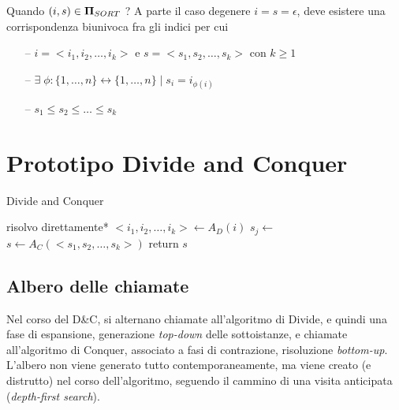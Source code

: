 Quando $ (i,s) \in \bm{\Pi}{}_{SORT} $ ? A parte il caso degenere $i=s=\epsilon$, deve esistere una corrispondenza biunivoca fra gli indici per cui
\begin{itemize}[noitemsep,parsep=0pt,partopsep=0pt]
    \item[--] $i = <i_1, i_2, \dots, i_k> $ e $ s = <s_1, s_2, \dots, s_k> $ con $k \geq 1$
    \item[--] $ \exists \;\phi:\{1, \dots, n\} \leftrightarrow \{1, \dots, n\} \;|\; s_i = i_{\phi(i)}$
    \item[--] $ s_1 \leq s_2 \leq \dots \leq s_k$ 
\end{itemize}

\section{Prototipo Divide and Conquer}

\begin{algorithm}[H]
\caption{Divide and Conquer}\label{alg:dnc}
\begin{algorithmic}[1]
                                     
            \State *risolvo direttamente*
        \EndIf
        \State $<i_1, i_2, \dots, i_k> \gets A_D(i)$    
                            
            \State $s_j \gets $ 
        \EndFor
        \State $s \gets A_C(<s_1, s_2, \dots, s_k>)$    
        \State return $s$
    \EndProcedure
\end{algorithmic}
\end{algorithm}

\subsection{Albero delle chiamate}
Nel corso del D\&C, si alternano chiamate all'algoritmo di Divide, e quindi una fase di espansione, generazione \textit{top-down} delle sottoistanze, e chiamate all'algoritmo di Conquer, associato a fasi di contrazione, risoluzione \textit{bottom-up}. L'albero non viene generato tutto contemporaneamente, ma viene creato (e distrutto) nel corso dell'algoritmo, seguendo il cammino di una visita anticipata (\textit{depth-first search}).

